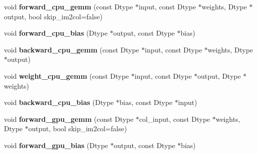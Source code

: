 \begin{DoxyCompactItemize}
\item 
\mbox{\label{classcaffe_1_1_base_convolution_layer_a2870d22074426089e31afd864b989743}} 
void {\bfseries forward\+\_\+cpu\+\_\+gemm} (const Dtype $\ast$input, const Dtype $\ast$weights, Dtype $\ast$output, bool skip\+\_\+im2col=false)
\item 
\mbox{\label{classcaffe_1_1_base_convolution_layer_a00ede6bbe48c3a6dedd21308a48f979f}} 
void {\bfseries forward\+\_\+cpu\+\_\+bias} (Dtype $\ast$output, const Dtype $\ast$bias)
\item 
\mbox{\label{classcaffe_1_1_base_convolution_layer_a3006035856c7f49371fe2b93ed38c935}} 
void {\bfseries backward\+\_\+cpu\+\_\+gemm} (const Dtype $\ast$input, const Dtype $\ast$weights, Dtype $\ast$output)
\item 
\mbox{\label{classcaffe_1_1_base_convolution_layer_aa0ce44e831ad98176dc8c06f2069df2e}} 
void {\bfseries weight\+\_\+cpu\+\_\+gemm} (const Dtype $\ast$input, const Dtype $\ast$output, Dtype $\ast$weights)
\item 
\mbox{\label{classcaffe_1_1_base_convolution_layer_a840ea8c0a485047a9760b7194b68db0c}} 
void {\bfseries backward\+\_\+cpu\+\_\+bias} (Dtype $\ast$bias, const Dtype $\ast$input)
\item 
\mbox{\label{classcaffe_1_1_base_convolution_layer_ace6f5e890e06e4812cf10e841f279346}} 
void {\bfseries forward\+\_\+gpu\+\_\+gemm} (const Dtype $\ast$col\+\_\+input, const Dtype $\ast$weights, Dtype $\ast$output, bool skip\+\_\+im2col=false)
\item 
\mbox{\label{classcaffe_1_1_base_convolution_layer_a2a1f9d98d332411a481d82c10d76b474}} 
void {\bfseries forward\+\_\+gpu\+\_\+bias} (Dtype $\ast$output, const Dtype $\ast$bias)
\item 
\mbox{\label{classcaffe_1_1_base_convolution_layer_aece62d609b5fb36990ef6d5c48472efe}} 

\end{DoxyCompactItemize}

